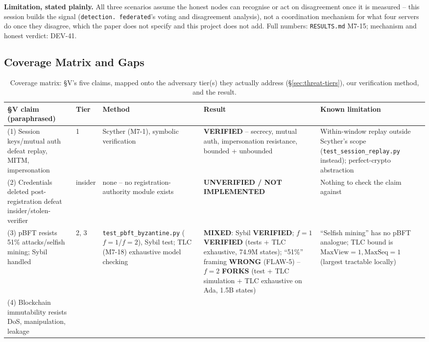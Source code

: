 \documentclass[conference]{IEEEtran}
\begin{document}
\textbf{Limitation, stated plainly.} All three scenarios assume the honest nodes can recognise or
act on disagreement once it is measured -- this session builds the signal (\texttt{detection.
federated}'s voting and disagreement analysis), not a coordination mechanism for what four
servers do once they disagree, which the paper does not specify and this project does not add.
Full numbers: \texttt{RESULTS.md} M7-15; mechanism and honest verdict: DEV-41.

\subsection{Coverage Matrix and Gaps}
\label{sec:threat-model}

\begin{table}[t]
\centering
\caption{Coverage matrix: \S V's five claims, mapped onto the adversary tier(s) they actually
address (\S\ref{sec:threat-tiers}), our verification method, and the result.}
\label{tab:threat-coverage}
\footnotesize
\begin{tabular}{p{3.2cm}p{1.1cm}p{3.7cm}p{3.0cm}p{3.8cm}}
\hline
\textbf{\S V claim (paraphrased)} & \textbf{Tier} & \textbf{Method} & \textbf{Result} & \textbf{Known limitation} \\
\hline
(1) Session keys/mutual auth defeat replay, MITM, impersonation &
1 &
Scyther (M7-1), symbolic verification &
\textbf{VERIFIED} -- secrecy, mutual auth, impersonation resistance, bounded + unbounded &
Within-window replay outside Scyther's scope (\texttt{test\_\allowbreak session\_\allowbreak replay.py} instead); perfect-crypto abstraction \\
(2) Credentials deleted post-registration defeat insider/stolen-verifier &
insider &
none -- no registration-authority module exists &
\textbf{UNVERIFIED / NOT IMPLEMENTED} &
Nothing to check the claim against \\
(3) pBFT resists 51\% attacks/selfish mining; Sybil handled &
2, 3 &
\texttt{test\_\allowbreak pbft\_\allowbreak byzantine.py} ($f{=}1$/$f{=}2$), Sybil test; TLC (M7-18) exhaustive model checking &
\textbf{MIXED}: Sybil \textbf{VERIFIED}; $f{=}1$ \textbf{VERIFIED} (tests + TLC exhaustive, 74.9M states); ``51\%'' framing \textbf{WRONG} (FLAW-5) -- $f{=}2$ \textbf{FORKS} (test + TLC simulation + TLC exhaustive on Ada, 1.5B states) &
``Selfish mining'' has no pBFT analogue; TLC bound is $\text{MaxView}{=}1,\text{MaxSeq}{=}1$ (largest tractable locally) \\
(4) Blockchain immutability resists DoS, manipulation, leakage &

\end{tabular}
\end{table}
\end{document}
